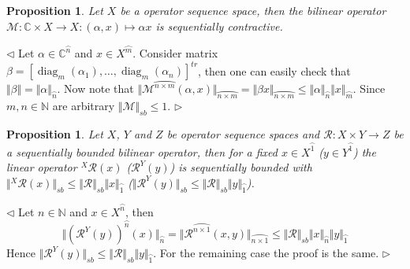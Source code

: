 \documentclass[12pt]{article}
\newtheorem{proposition}[theorem]{Proposition}
\newenvironment{proof}{\par $\triangleleft$}{$\triangleright$}
\begin{document}
\begin{proposition}\label{PrScalMultSB}
Let $X$ be a operator sequence space, then the bilinear operator 
$\mathcal{M}:\mathbb{C}\times X\to X:(\alpha, x)\mapsto \alpha x$ is 
sequentially contractive.
\end{proposition}
\begin{proof}
Let $\alpha\in\mathbb{C}^{\wideparen{n}}$ and $x\in X^{\wideparen{m}}$. 
Consider matrix 
$\beta
={
    [\operatorname{diag}_m(\alpha_1),\ldots,\operatorname{diag}_m(\alpha_n)]
}^{tr}$, 
then one can easily check that 
$\Vert\beta\Vert=\Vert\alpha\Vert_{\wideparen{n}}$. Now note that 
$\Vert
    \mathcal{M}^{\wideparen{n\times m}}(\alpha, x)
\Vert_{\wideparen{n\times m}}
=\Vert\beta x\Vert_{\wideparen{n\times m}}
\leq\Vert\alpha\Vert_{\wideparen{n}}\Vert x\Vert_{\wideparen{m}}$. 
Since $m,n\in\mathbb{N}$ are arbitrary $\Vert\mathcal{M}\Vert_{sb}\leq 1$.
\end{proof}


\begin{proposition}\label{PrRestrOfSBBilOpIsSB}
Let $X$, $Y$ and $Z$ be operator sequence spaces and 
$\mathcal{R}:X\times Y\to Z$ be a sequentially bounded bilinear operator, then 
for a fixed $x\in X^{\wideparen{1}}$ ($y\in Y^{\wideparen{1}}$) the linear 
operator ${}^X\mathcal{R}(x)$ ($\mathcal{R}^Y(y)$) is sequentially bounded with 
$\Vert
    {}^X\mathcal{R}(x)
\Vert_{sb}
\leq\Vert\mathcal{R}\Vert_{sb}
\Vert x\Vert_{\wideparen{1}}$ 
($\Vert
    \mathcal{R}^Y(y)
\Vert_{sb}\leq\Vert\mathcal{R}\Vert_{sb}\Vert y\Vert_{\wideparen{1}}$).
\end{proposition}
\begin{proof}
Let $n\in\mathbb{N}$ and $x\in X^{\wideparen{n}}$, then
$$
\Vert{(\mathcal{R}^Y(y))}^{\wideparen{n}}(x)\Vert_{\wideparen{n}} =\Vert
\mathcal{R}^{\wideparen{n\times 1}}(x,y)\Vert_{\wideparen{n\times 1}} \leq\Vert
\mathcal{R}\Vert_{sb}\Vert x\Vert_{\wideparen{n}}\Vert y\Vert_{\wideparen{1}}
$$
Hence 
$\Vert
    \mathcal{R}^Y(y)
\Vert_{sb}\leq\Vert\mathcal{R}\Vert_{sb}\Vert y\Vert_{\wideparen{1}}$.
For the remaining case the proof is the same.
\end{proof}
\end{document}

